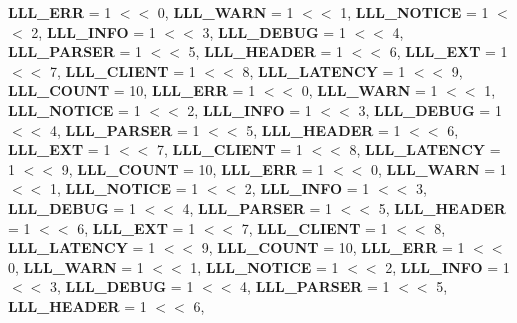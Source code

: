 \begin{DoxyCompactItemize}
{\bfseries L\+L\+L\+\_\+\+E\+RR} = 1 $<$$<$ 0, 
\newline
{\bfseries L\+L\+L\+\_\+\+W\+A\+RN} = 1 $<$$<$ 1, 
{\bfseries L\+L\+L\+\_\+\+N\+O\+T\+I\+CE} = 1 $<$$<$ 2, 
{\bfseries L\+L\+L\+\_\+\+I\+N\+FO} = 1 $<$$<$ 3, 
{\bfseries L\+L\+L\+\_\+\+D\+E\+B\+UG} = 1 $<$$<$ 4, 
\newline
{\bfseries L\+L\+L\+\_\+\+P\+A\+R\+S\+ER} = 1 $<$$<$ 5, 
{\bfseries L\+L\+L\+\_\+\+H\+E\+A\+D\+ER} = 1 $<$$<$ 6, 
{\bfseries L\+L\+L\+\_\+\+E\+XT} = 1 $<$$<$ 7, 
{\bfseries L\+L\+L\+\_\+\+C\+L\+I\+E\+NT} = 1 $<$$<$ 8, 
\newline
{\bfseries L\+L\+L\+\_\+\+L\+A\+T\+E\+N\+CY} = 1 $<$$<$ 9, 
{\bfseries L\+L\+L\+\_\+\+C\+O\+U\+NT} = 10, 
{\bfseries L\+L\+L\+\_\+\+E\+RR} = 1 $<$$<$ 0, 
{\bfseries L\+L\+L\+\_\+\+W\+A\+RN} = 1 $<$$<$ 1, 
\newline
{\bfseries L\+L\+L\+\_\+\+N\+O\+T\+I\+CE} = 1 $<$$<$ 2, 
{\bfseries L\+L\+L\+\_\+\+I\+N\+FO} = 1 $<$$<$ 3, 
{\bfseries L\+L\+L\+\_\+\+D\+E\+B\+UG} = 1 $<$$<$ 4, 
{\bfseries L\+L\+L\+\_\+\+P\+A\+R\+S\+ER} = 1 $<$$<$ 5, 
\newline
{\bfseries L\+L\+L\+\_\+\+H\+E\+A\+D\+ER} = 1 $<$$<$ 6, 
{\bfseries L\+L\+L\+\_\+\+E\+XT} = 1 $<$$<$ 7, 
{\bfseries L\+L\+L\+\_\+\+C\+L\+I\+E\+NT} = 1 $<$$<$ 8, 
{\bfseries L\+L\+L\+\_\+\+L\+A\+T\+E\+N\+CY} = 1 $<$$<$ 9, 
\newline
{\bfseries L\+L\+L\+\_\+\+C\+O\+U\+NT} = 10, 
{\bfseries L\+L\+L\+\_\+\+E\+RR} = 1 $<$$<$ 0, 
{\bfseries L\+L\+L\+\_\+\+W\+A\+RN} = 1 $<$$<$ 1, 
{\bfseries L\+L\+L\+\_\+\+N\+O\+T\+I\+CE} = 1 $<$$<$ 2, 
\newline
{\bfseries L\+L\+L\+\_\+\+I\+N\+FO} = 1 $<$$<$ 3, 
{\bfseries L\+L\+L\+\_\+\+D\+E\+B\+UG} = 1 $<$$<$ 4, 
{\bfseries L\+L\+L\+\_\+\+P\+A\+R\+S\+ER} = 1 $<$$<$ 5, 
{\bfseries L\+L\+L\+\_\+\+H\+E\+A\+D\+ER} = 1 $<$$<$ 6, 
\newline
{\bfseries L\+L\+L\+\_\+\+E\+XT} = 1 $<$$<$ 7, 
{\bfseries L\+L\+L\+\_\+\+C\+L\+I\+E\+NT} = 1 $<$$<$ 8, 
{\bfseries L\+L\+L\+\_\+\+L\+A\+T\+E\+N\+CY} = 1 $<$$<$ 9, 
{\bfseries L\+L\+L\+\_\+\+C\+O\+U\+NT} = 10, 
\newline
{\bfseries L\+L\+L\+\_\+\+E\+RR} = 1 $<$$<$ 0, 
{\bfseries L\+L\+L\+\_\+\+W\+A\+RN} = 1 $<$$<$ 1, 
{\bfseries L\+L\+L\+\_\+\+N\+O\+T\+I\+CE} = 1 $<$$<$ 2, 
{\bfseries L\+L\+L\+\_\+\+I\+N\+FO} = 1 $<$$<$ 3, 
\newline
{\bfseries L\+L\+L\+\_\+\+D\+E\+B\+UG} = 1 $<$$<$ 4, 
{\bfseries L\+L\+L\+\_\+\+P\+A\+R\+S\+ER} = 1 $<$$<$ 5, 
{\bfseries L\+L\+L\+\_\+\+H\+E\+A\+D\+ER} = 1 $<$$<$ 6, 
$$
\end{DoxyCompactItemize}
